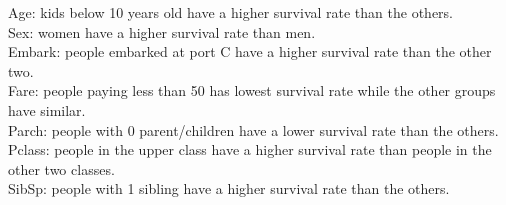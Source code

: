 \documentclass[12pt]{article}
\begin{document}
        Age: kids below 10 years old have a higher survival rate than the others.\\
        \hspace*{6mm}Sex: women have a higher survival rate than men.\\
        \hspace*{6mm}Embark: people embarked at port C have a higher survival rate than the other two. \\
        \hspace*{6mm}Fare: people paying less than 50 has lowest survival rate while the other groups have similar.\\
       \hspace*{6mm} Parch: people with 0 parent/children have a lower survival rate than the others.\\
        \hspace*{6mm}Pclass: people in the upper class have a higher survival rate than people in the other two classes.\\
        \hspace*{6mm}SibSp: people with 1 sibling have a higher survival rate than the others.\\
\end{document}
